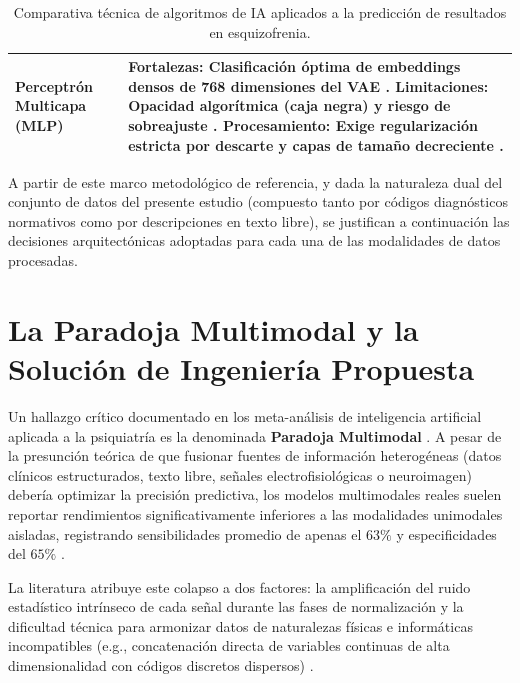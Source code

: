 \documentclass[12pt,a4paper,onecolumn,oneside]{report}
\begin{document}
\begin{table}[htbp]
\begin{tabularx}{\textwidth}{|p{3cm}|X|}
\textbf{Perceptrón Multicapa (MLP)} & 
\textbf{Fortalezas:} Clasificación óptima de embeddings densos de 768 dimensiones del VAE \cite{saboori2025predictive}.\newline
\textbf{Limitaciones:} Opacidad algorítmica (caja negra) y riesgo de sobreajuste \cite{lopez2026ia, jimenez2023xai}.\newline
\textbf{Procesamiento:} Exige regularización estricta por descarte y capas de tamaño decreciente \cite{jimenez2023xai}. \\ \hline
\end{tabularx}
\caption{Comparativa técnica de algoritmos de IA aplicados a la predicción de resultados en esquizofrenia.}
\label{tab:comparativa_algoritmos}
\end{table}

A partir de este marco metodológico de referencia, y dada la naturaleza dual del conjunto de datos del presente estudio (compuesto tanto por códigos diagnósticos normativos como por descripciones en texto libre), se justifican a continuación las decisiones arquitectónicas adoptadas para cada una de las modalidades de datos procesadas.
\clearpage

\section{La Paradoja Multimodal y la Solución de Ingeniería Propuesta}

Un hallazgo crítico documentado en los meta-análisis de inteligencia artificial aplicada a la psiquiatría es la denominada \textbf{Paradoja Multimodal} \cite{saboori2025predictive}. A pesar de la presunción teórica de que fusionar fuentes de información heterogéneas (datos clínicos estructurados, texto libre, señales electrofisiológicas o neuroimagen) debería optimizar la precisión predictiva, los modelos multimodales reales suelen reportar rendimientos significativamente inferiores a las modalidades unimodales aisladas, registrando sensibilidades promedio de apenas el $63\%$ y especificidades del $65\%$ \cite{saboori2025predictive}. 

La literatura atribuye este colapso a dos factores: la amplificación del ruido estadístico intrínseco de cada señal durante las fases de normalización y la dificultad técnica para armonizar datos de naturalezas físicas e informáticas incompatibles (e.g., concatenación directa de variables continuas de alta dimensionalidad con códigos discretos dispersos) \cite{saboori2025predictive, lai2021schizophrenia}.
\end{document}
